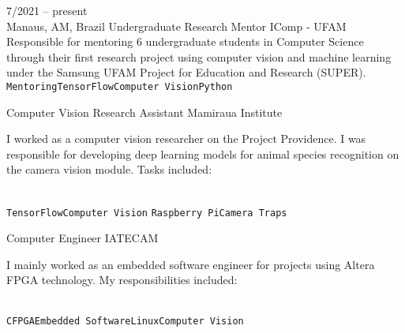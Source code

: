 \documentclass[10pt]{developercv} %
\begin{document}


\begin{entrylist}
  \entry
  {7/2021 -- present\\\footnotesize{Manaus, AM, Brazil}}
  {Undergraduate Research Mentor}
  {IComp - UFAM}
  {Responsible for mentoring 6 undergraduate students in Computer Science 
through their first research project using computer vision and machine learning 
under the Samsung UFAM Project for Education and Research (SUPER).\\ 
\texttt{Mentoring}\slashsep\texttt{TensorFlow}\slashsep\texttt{Computer 
Vision}\slashsep\texttt{Python}}

  {Computer Vision Research Assistant}
  {Mamiraua Institute}
  {
    I worked as a computer vision researcher on the Project Providence. I was 
responsible for developing deep learning models for animal species recognition 
on the camera vision module. Tasks included:\\
    \begin{contributionlist}
    \end{contributionlist}\\
\texttt{TensorFlow}\slashsep\texttt{Computer Vision}
\slashsep\texttt {Raspberry Pi}\slashsep\texttt{Camera Traps}}
  
  {Computer Engineer}
  {IATECAM}
  {
    I mainly worked as an embedded software engineer for projects using Altera 
FPGA technology. My responsibilities included:\\
    \begin{contributionlist}
    \end{contributionlist}\\
    \texttt{C}\slashsep\texttt{FPGA}\slashsep\texttt{Embedded 
Software}\slashsep\texttt{Linux}\slashsep\texttt{Computer Vision}}
  

\end{entrylist}
\end{document}
